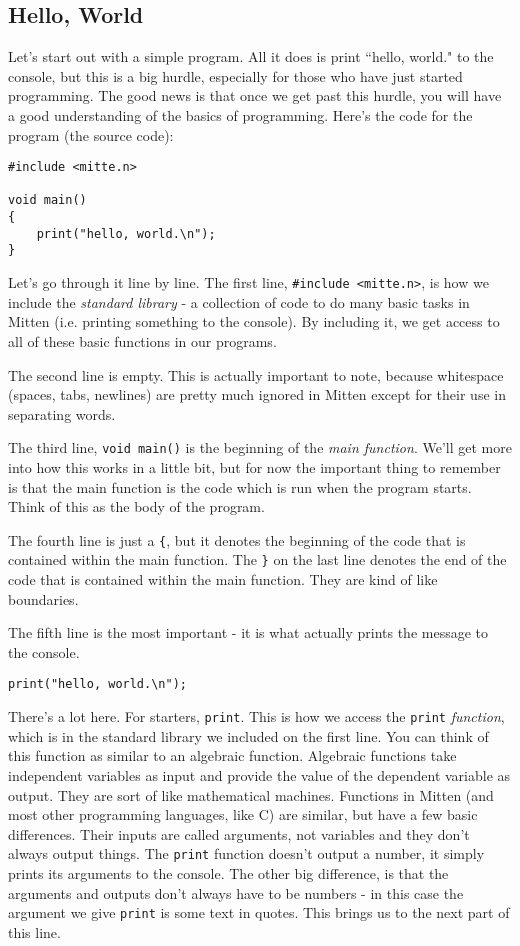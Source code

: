 \documentclass[10pt,a4paper]{article}
\begin{document}
\subsection{Hello, World}
Let's start out with a simple program. All it does is print ``hello, world." to the console, but this is a big hurdle, especially for those who have just started programming. The good news is that once we get past this hurdle, you will have a good understanding of the basics of programming. Here's the code for the program (the source code):
\begin{verbatim}
#include <mitte.n>

void main()
{
    print("hello, world.\n");
}
\end{verbatim}

Let's go through it line by line. The first line, \verb|#include <mitte.n>|, is how we include the \textit{standard library} - a collection of code to do many basic tasks in Mitten (i.e. printing something to the console). By including it, we get access to all of these basic functions in our programs.

The second line is empty. This is actually important to note, because whitespace (spaces, tabs, newlines) are pretty much ignored in Mitten except for their use in separating words.

The third line, \verb|void main()| is the beginning of the \textit{main function}. We'll get more into how this works in a little bit, but for now the important thing to remember is that the main function is the code which is run when the program starts. Think of this as the body of the program.

The fourth line is just a \verb|{|, but it denotes the beginning of the code that is contained within the main function. The \verb|}| on the last line denotes the end of the code that is contained within the main function. They are kind of like boundaries.

The fifth line is the most important - it is what actually prints the message to the console.
\begin{verbatim}
print("hello, world.\n");
\end{verbatim}

There's a lot here. For starters, \verb|print|. This is how we access the \verb|print| \textit{function}, which is in the standard library we included on the first line. You can think of this function as similar to an algebraic function. Algebraic functions take independent variables as input and provide the value of the dependent variable as output. They are sort of like mathematical machines. Functions in Mitten (and most other programming languages, like C) are similar, but have a few basic differences. Their inputs are called arguments, not variables and they don't always output things. The \verb|print| function doesn't output a number, it simply prints its arguments to the console. The other big difference, is that the arguments and outputs don't always have to be numbers - in this case the argument we give \verb|print| is some text in quotes. This brings us to the next part of this line.
\end{document}
